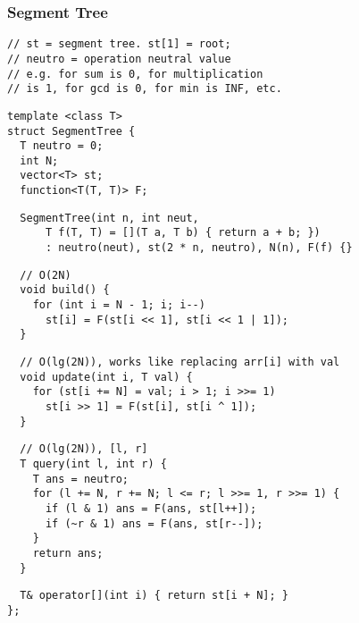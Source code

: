 \documentclass[twoside]{article}
\newcommand{\fileTitleStyle}{\large\underline}
\begin{document}
\begin{multicols*}{2}
\subsubsection*{Segment Tree}
\begin{verbatim}
// st = segment tree. st[1] = root;
// neutro = operation neutral value
// e.g. for sum is 0, for multiplication
// is 1, for gcd is 0, for min is INF, etc.
\end{verbatim}
\vspace{-12pt}
\begin{verbatim}
template <class T>
struct SegmentTree {
  T neutro = 0;
  int N;
  vector<T> st;
  function<T(T, T)> F;
\end{verbatim}
\vspace{-12pt}
\begin{verbatim}
  SegmentTree(int n, int neut,
      T f(T, T) = [](T a, T b) { return a + b; })
      : neutro(neut), st(2 * n, neutro), N(n), F(f) {}
\end{verbatim}
\vspace{-12pt}
\begin{verbatim}
  // O(2N)
  void build() {
    for (int i = N - 1; i; i--)
      st[i] = F(st[i << 1], st[i << 1 | 1]);
  }
\end{verbatim}
\vspace{-12pt}
\begin{verbatim}
  // O(lg(2N)), works like replacing arr[i] with val
  void update(int i, T val) {
    for (st[i += N] = val; i > 1; i >>= 1)
      st[i >> 1] = F(st[i], st[i ^ 1]);
  }
\end{verbatim}
\vspace{-12pt}
\begin{verbatim}
  // O(lg(2N)), [l, r]
  T query(int l, int r) {
    T ans = neutro;
    for (l += N, r += N; l <= r; l >>= 1, r >>= 1) {
      if (l & 1) ans = F(ans, st[l++]);
      if (~r & 1) ans = F(ans, st[r--]);
    }
    return ans;
  }
\end{verbatim}
\vspace{-12pt}
\begin{verbatim}
  T& operator[](int i) { return st[i + N]; }
};
\end{verbatim}

\subsubsectionfont{\centering\bfseries\Large}
\subsubsectionfont{\fileTitleStyle}

\end{multicols*}
\end{document}
